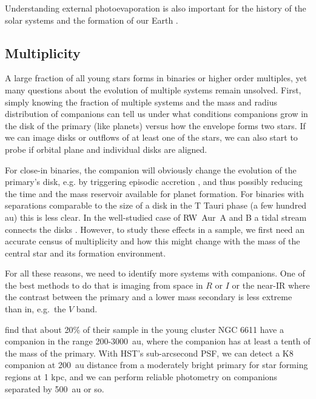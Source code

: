 \documentclass[12pt]{article}
\begin{document}
Understanding external photoevaporation is also important for the history of the solar systems and the formation of our Earth \citep{2015ApJ...815..112K}.

\subsection{Multiplicity}
A large fraction of all young stars forms in binaries or higher order multiples, yet many questions about the evolution of multiple systems remain unsolved. First, simply knowing the fraction of multiple systems and the mass and radius distribution of companions can tell us under what conditions companions grow in the disk of the primary (like planets) versus how the envelope forms two stars. If we can image disks or outflows of at least one of the stars, we can also start to probe if orbital plane and individual disks are aligned.

For close-in binaries, the companion will obviously change the evolution of the primary's disk, e.g. by triggering episodic accretion \citep{2013ApJ...766...62G}, and thus possibly reducing the time and the mass reservoir available for planet formation. For binaries with separations comparable to the size of a disk in the T Tauri phase (a few hundred au) this is less clear. In the well-studied case of RW~Aur~A and B a tidal stream connects the disks \citep{2006A&A...452..897C}. However, to study these effects in a sample, we first need an accurate census of multiplicity and how this might change with the mass of the central star and its formation environment.

For all these reasons, we need to identify more systems with companions. One of
the best methods to do that is imaging from space in $R$ or $I$ or the near-IR where the contrast between the primary and a lower mass secondary is less extreme than in, e.g.\ the $V$ band. 

\citet{2001A&A...379..147D} find that about 20\% of their sample in the young
cluster NGC 6611 have a companion in the range 200-3000~au, where the companion
has at least a tenth of the mass of the primary. With HST's sub-arcsecond PSF,
we can detect a K8 companion at 200~au distance from a moderately bright
primary for star forming regions at 1 kpc, and we can perform reliable photometry on companions separated by 500~au or so. 
\end{document}

